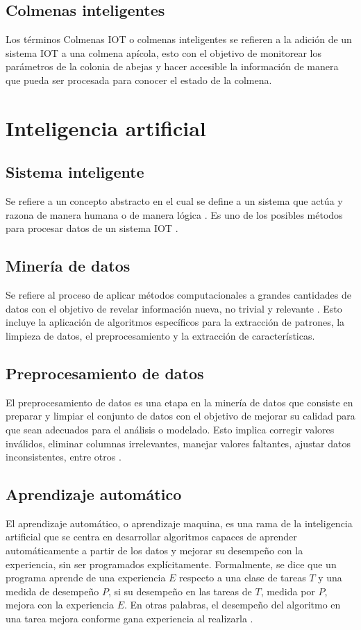 \subsection{Colmenas inteligentes}
Los términos Colmenas IOT o colmenas inteligentes se refieren a la adición de un sistema IOT a una colmena apícola, esto con el objetivo de monitorear los parámetros de la colonia de abejas y hacer accesible la información de manera que pueda ser procesada para conocer el estado de la colmena. \cite{open_source_beehives_project_iaac}

\section{Inteligencia artificial}

\subsection{Sistema inteligente}
Se refiere a un concepto abstracto en el cual se define a un sistema que actúa y razona de manera humana o de manera lógica \cite{russell_norvig_2022}. Es uno de los posibles métodos para procesar datos de un sistema IOT \cite{open_source_beehives_project_iaac}.

\subsection{Minería de datos}
Se refiere al proceso de aplicar métodos computacionales a grandes cantidades de datos con el objetivo de revelar información nueva, no trivial y relevante \cite{fayyad1996kdd}. Esto incluye la aplicación de algoritmos específicos para la extracción de patrones, la limpieza de datos, el preprocesamiento y la extracción de características.


\subsection{Preprocesamiento de datos}
El preprocesamiento de datos es una etapa en la minería de datos que consiste en preparar y limpiar el conjunto de datos con el objetivo de mejorar su calidad para que sean adecuados para el análisis o modelado. Esto implica corregir valores inválidos, eliminar columnas irrelevantes, manejar valores faltantes, ajustar datos inconsistentes, entre otros \cite{statistical_modeling_in_machine_learning_2023}.

\subsection{Aprendizaje automático}
El aprendizaje automático, o aprendizaje maquina, es una rama de la inteligencia artificial que se centra en desarrollar algoritmos capaces de aprender automáticamente a partir de los datos y mejorar su desempeño con la experiencia, sin ser programados explícitamente. Formalmente, se dice que un programa aprende de una experiencia $E$ respecto a una clase de tareas $T$ y una medida de desempeño $P$, si su desempeño en las tareas de $T$, medida por $P$, mejora con la experiencia $E$. En otras palabras, el desempeño del algoritmo en una tarea mejora conforme gana experiencia al realizarla \cite{mitchell1997machine}.


